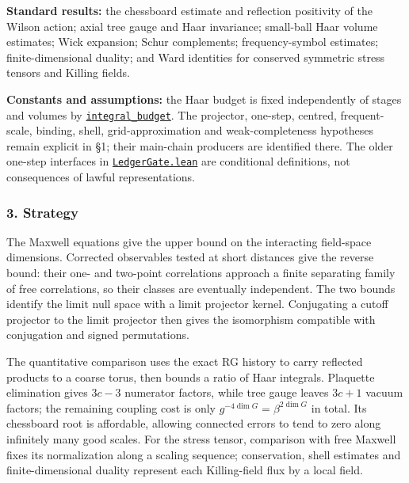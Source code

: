 \documentclass[
  letterpaper,
  11pt]{article}
\begin{document}
\textbf{Standard results:} the chessboard estimate and reflection
positivity of the Wilson action; axial tree gauge and Haar invariance;
small-ball Haar volume estimates; Wick expansion; Schur complements;
frequency-symbol estimates; finite-dimensional duality; and Ward
identities for conserved symmetric stress tensors and Killing fields.

\textbf{Constants and assumptions:} the Haar budget is fixed
independently of stages and volumes by
\href{https://github.com/yang-mills-group/OpenAI-YM-20261028/blob/3456e5e75cf8d4cd558955a5c7638fba2d68f464/YM/Next/RANK/Haar.lean\#L170-L211}{\texttt{integral\_budget}}.
The projector, one-step, centred, frequent-scale, binding, shell,
grid-approximation and weak-completeness hypotheses remain explicit in
§1; their main-chain producers are identified there. The older one-step
interfaces in
\href{https://github.com/yang-mills-group/OpenAI-YM-20261028/blob/3456e5e75cf8d4cd558955a5c7638fba2d68f464/YM/Next/RANK/LedgerGate.lean}{\texttt{LedgerGate.lean}}
are conditional definitions, not consequences of lawful representations.

\subsubsection{3. Strategy}\label{strategy-13}

The Maxwell equations give the upper bound on the interacting
field-space dimensions. Corrected observables tested at short distances
give the reverse bound: their one- and two-point correlations approach a
finite separating family of free correlations, so their classes are
eventually independent. The two bounds identify the limit null space
with a limit projector kernel. Conjugating a cutoff projector to the
limit projector then gives the isomorphism compatible with conjugation
and signed permutations.

The quantitative comparison uses the exact RG history to carry reflected
products to a coarse torus, then bounds a ratio of Haar integrals.
Plaquette elimination gives \(3c-3\) numerator factors, while tree gauge
leaves \(3c+1\) vacuum factors; the remaining coupling cost is only
\(g^{-4\dim G}=\beta^{2\dim G}\) in total. Its chessboard root is
affordable, allowing connected errors to tend to zero along infinitely
many good scales. For the stress tensor, comparison with free Maxwell
fixes its normalization along a scaling sequence; conservation, shell
estimates and finite-dimensional duality represent each Killing-field
flux by a local field.
\end{document}
